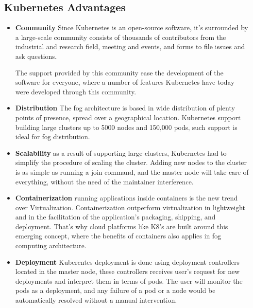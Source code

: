 \documentclass[letterpaper,twocolumn,10pt]{article}
\begin{document}
\subsection{Kubernetes Advantages}
\begin{itemize}
\itemsep0em

\item{\bf Community} 
Since Kubernetes is an open-source software, it's surrounded by a large-scale community consists of thousands of contributors from the industrial and research field, meeting and events, and forms to file issues and ask questions.

The support provided by this community ease the development of the software for everyone, where a number of features Kubernetes have today were developed through this community.  
\item {\bf Distribution} 
The fog architecture is based in wide distribution of plenty points of presence, spread over a geographical location. Kubernetes support building large clusters up to 5000 nodes and 150,000 pods, such support is ideal for fog distribution. 
\item {\bf Scalability} as a result of supporting large clusters, Kubernetes had to simplify the procedure of scaling the cluster. Adding new nodes to the cluster is as simple as running a join command, and the master node will take care of everything, without the need of the maintainer interference. 


\item {\bf Containerization} running applications inside containers is the new trend over Virtualization. Containerization outperform virtualization in lightweight and in the facilitation of  the application's packaging, shipping, and deployment. That's why cloud platforms like K8's are built around this emerging concept, where the benefits of containers also applies in fog computing architecture.  

\item {\bf Deployment} Kuberentes deployment is done using deployment controllers located in the master node, these controllers receives user's request for new deployments and interpret them in terms of pods. The user will monitor the pods as a deployment, and any failure of a pod or a node would be automatically resolved without a manual intervention. 





\end{itemize}
\end{document}
